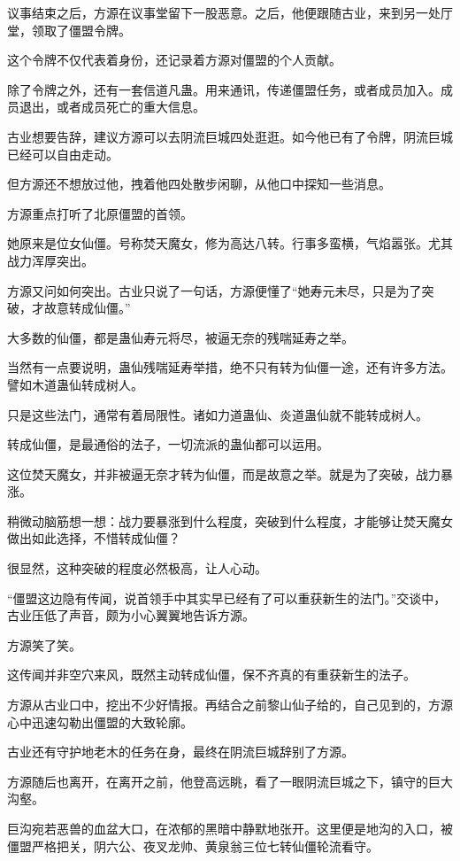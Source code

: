 \begin{this_body}
议事结束之后，方源在议事堂留下一股恶意。之后，他便跟随古业，来到另一处厅堂，领取了僵盟令牌。

这个令牌不仅代表着身份，还记录着方源对僵盟的个人贡献。

除了令牌之外，还有一套信道凡蛊。用来通讯，传递僵盟任务，或者成员加入。成员退出，或者成员死亡的重大信息。

古业想要告辞，建议方源可以去阴流巨城四处逛逛。如今他已有了令牌，阴流巨城已经可以自由走动。

但方源还不想放过他，拽着他四处散步闲聊，从他口中探知一些消息。

方源重点打听了北原僵盟的首领。

她原来是位女仙僵。号称焚天魔女，修为高达八转。行事多蛮横，气焰嚣张。尤其战力浑厚突出。

方源又问如何突出。古业只说了一句话，方源便懂了“她寿元未尽，只是为了突破，才故意转成仙僵。”

大多数的仙僵，都是蛊仙寿元将尽，被逼无奈的残喘延寿之举。

当然有一点要说明，蛊仙残喘延寿举措，绝不只有转为仙僵一途，还有许多方法。譬如木道蛊仙转成树人。

只是这些法门，通常有着局限性。诸如力道蛊仙、炎道蛊仙就不能转成树人。

转成仙僵，是最通俗的法子，一切流派的蛊仙都可以运用。

这位焚天魔女，并非被逼无奈才转为仙僵，而是故意之举。就是为了突破，战力暴涨。

稍微动脑筋想一想：战力要暴涨到什么程度，突破到什么程度，才能够让焚天魔女做出如此选择，不惜转成仙僵？

很显然，这种突破的程度必然极高，让人心动。

“僵盟这边隐有传闻，说首领手中其实早已经有了可以重获新生的法门。”交谈中，古业压低了声音，颇为小心翼翼地告诉方源。

方源笑了笑。

这传闻并非空穴来风，既然主动转成仙僵，保不齐真的有重获新生的法子。

方源从古业口中，挖出不少好情报。再结合之前黎山仙子给的，自己见到的，方源心中迅速勾勒出僵盟的大致轮廓。

古业还有守护地老木的任务在身，最终在阴流巨城辞别了方源。

方源随后也离开，在离开之前，他登高远眺，看了一眼阴流巨城之下，镇守的巨大沟壑。

巨沟宛若恶兽的血盆大口，在浓郁的黑暗中静默地张开。这里便是地沟的入口，被僵盟严格把关，阴六公、夜叉龙帅、黄泉翁三位七转仙僵轮流看守。


\end{this_body}
